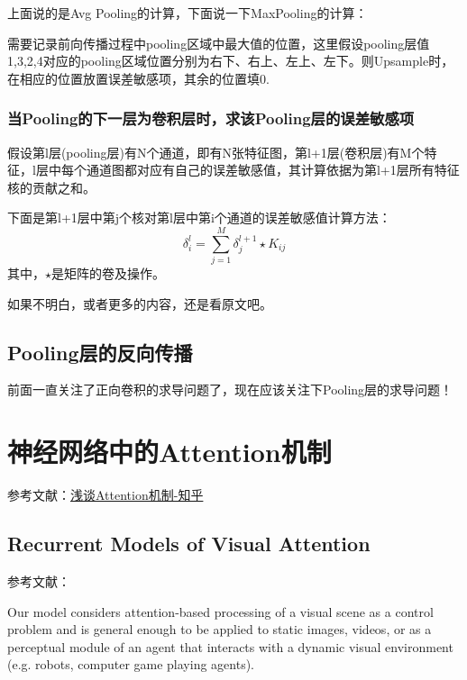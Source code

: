 上面说的是Avg Pooling的计算，下面说一下MaxPooling的计算：

需要记录前向传播过程中pooling区域中最大值的位置，这里假设pooling层值1,3,2,4对应的pooling区域位置分别为右下、右上、左上、左下。则Upsample时，在相应的位置放置误差敏感项，其余的位置填0.

\subsubsection{当Pooling的下一层为卷积层时，求该Pooling层的误差敏感项}

假设第l层(pooling层)有N个通道，即有N张特征图，第l+1层(卷积层)有M个特征，l层中每个通道图都对应有自己的误差敏感值，其计算依据为第l+1层所有特征核的贡献之和。

下面是第l+1层中第j个核对第l层中第i个通道的误差敏感值计算方法：
\begin{displaymath}
\delta_i^l = \sum_{j=1}^{M}\delta_j^{l+1} \star K_{ij}
\end{displaymath}
其中，$\star$是矩阵的卷及操作。

如果不明白，或者更多的内容，还是看原文吧。








\subsection{Pooling层的反向传播}

前面一直关注了正向卷积的求导问题了，现在应该关注下Pooling层的求导问题！







\section{神经网络中的Attention机制}

参考文献：\href{https://zhuanlan.zhihu.com/p/35571412}{浅谈Attention机制-知乎}

\subsection{Recurrent Models of Visual Attention}

参考文献：\cite{Attention2014}

Our model considers attention-based processing of a visual scene as a control problem and is general enough to be applied to static images, videos,
or as a perceptual module of an agent that interacts with a dynamic visual environment (e.g. robots,
computer game playing agents).

